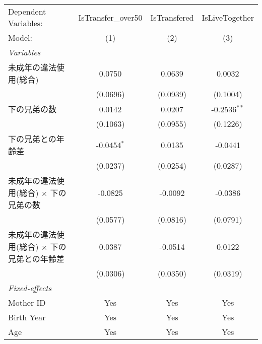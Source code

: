 \documentclass{article}
\begin{document}
\begin{landscape}


\begingroup
\centering
\begin{threeparttable}[b]
   \begin{tabular}{lccc}
      \tabularnewline \midrule \midrule
      Dependent Variables:                                & IsTransfer\_over50  & IsTransfered & IsLiveTogether\\  
      Model:                                              & (1)                 & (2)          & (3)\\  
      \midrule
      \emph{Variables}\\
      未成年の違法使用(総合)                              & 0.0750              & 0.0639       & 0.0032\\   
                                                          & (0.0696)            & (0.0939)     & (0.1004)\\   
      下の兄弟の数                                        & 0.0142              & 0.0207       & -0.2536$^{**}$\\   
                                                          & (0.1063)            & (0.0955)     & (0.1226)\\   
      下の兄弟との年齢差                                  & -0.0454$^{*}$       & 0.0135       & -0.0441\\   
                                                          & (0.0237)            & (0.0254)     & (0.0287)\\   
      未成年の違法使用(総合) $\times$ 下の兄弟の数        & -0.0825             & -0.0092      & -0.0386\\   
                                                          & (0.0577)            & (0.0816)     & (0.0791)\\   
      未成年の違法使用(総合) $\times$ 下の兄弟との年齢差  & 0.0387              & -0.0514      & 0.0122\\   
                                                          & (0.0306)            & (0.0350)     & (0.0319)\\   
      \midrule
      \emph{Fixed-effects}\\
      Mother ID                                           & Yes                 & Yes          & Yes\\  
      Birth Year                                          & Yes                 & Yes          & Yes\\  
      Age                                                 & Yes                 & Yes          & Yes\\  

\end{tabular}
\end{threeparttable}
\end{landscape}
\end{document}
